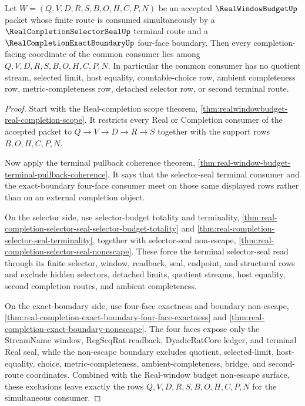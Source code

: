\begin{theorem}
\label{thm:real-window-budget-terminal-pullback-nonescape}
Let $W=(Q,V,D,R,S,B,O,H,C,P,N)$ be an accepted
$\RealWindowBudgetUp$ packet whose finite route is consumed simultaneously by
a $\RealCompletionSelectorSealUp$ terminal route and a
$\RealCompletionExactBoundaryUp$ four-face boundary. Then every
completion-facing coordinate of the common consumer lies among
$Q,V,D,R,S,B,O,H,C,P,N$. In particular the common consumer has no quotient
stream, selected limit, host equality, countable-choice row, ambient
completeness row, metric-completeness row, detached selector row, or second
terminal route.
\end{theorem}
\begin{proof}
Start with the Real-completion scope theorem,
\autoref{thm:realwindowbudget-real-completion-scope}. It restricts every
Real or Completion consumer of the accepted packet to
$Q \to V \to D \to R \to S$ together with the support rows $B,O,H,C,P,N$.

Now apply the terminal pullback coherence theorem,
\autoref{thm:real-window-budget-terminal-pullback-coherence}. It says that
the selector-seal terminal consumer and the exact-boundary four-face consumer
meet on those same displayed rows rather than on an external completion
object.

On the selector side, use selector-budget totality and terminality,
\autoref{thm:real-completion-selector-seal-selector-budget-totality} and
\autoref{thm:real-completion-selector-seal-terminality}, together with
selector-seal non-escape,
\autoref{thm:real-completion-selector-seal-nonescape}. These force the
terminal selector-seal read through its finite selector, window, readback,
seal, endpoint, and structural rows and exclude hidden selectors, detached
limits, quotient streams, host equality, second completion routes, and
ambient completeness.

On the exact-boundary side, use four-face exactness and boundary non-escape,
\autoref{thm:real-completion-exact-boundary-four-face-exactness} and
\autoref{thm:real-completion-exact-boundary-nonescape}. The four faces
expose only the StreamName window, RegSeqRat readback, DyadicRatCore ledger,
and terminal Real seal, while the non-escape boundary excludes quotient,
selected-limit, host-equality, choice, metric-completeness,
ambient-completeness, bridge, and second-route coordinates. Combined with
the Real-window budget non-escape surface, these exclusions leave exactly the
rows $Q,V,D,R,S,B,O,H,C,P,N$ for the simultaneous consumer.
\end{proof}

